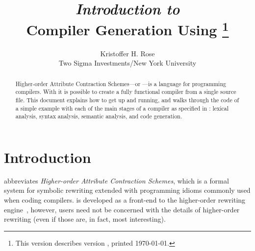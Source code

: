 \documentclass[11pt]{article} %
\title{
  \emph{Introduction to}\\
  Compiler Generation Using \HAX%
  \thanks{This version describes \HAX version \version, printed \today.}
}
\author{
  Kristoffer H. Rose\\
  Two Sigma Investments/New York University
}
\begin{document}
\maketitle

\begin{abstract}\noindent
  Higher-order Attribute Contraction Schemes---or \HAX---is a language for programming compilers.
  With \HAX it is possible to create a fully functional compiler from a single source file.  This
  document explains how to get \HAX up and running, and walks through the code of a simple example
  with each of the main stages of a compiler as specified in \HAX: lexical analysis, syntax
  analysis, semantic analysis, and code generation.
\end{abstract}

\compacttableofcontents


\section{Introduction}\label{sec:intro}

\HAX abbreviates \emph{Higher-order Attribute Contraction Schemes}, which is a formal system for
symbolic rewriting extended with programming idioms commonly used when coding compilers. \HAX is
developed as a front-end to the \CRSX higher-order rewriting engine~\cite{crsx}, however, \HAX users
need not be concerned with the details of higher-order rewriting (even if those are, in fact, most
interesting).
\end{document}
